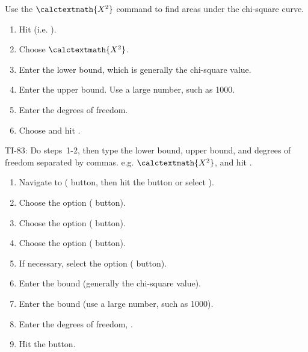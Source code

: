\begin{termBox}{
Use the $\calctextmath{X^2}$ command to find areas under the chi-square curve.
\begin{enumerate}
\setlength{\itemsep}{0mm}
\item Hit   (i.e. ).
\item Choose $\calctextmath{X^2}$.
\item Enter the lower bound, which is generally the chi-square value.
\item Enter the upper bound. Use a large number, such as 1000.
\item Enter the degrees of freedom.
\item Choose  and hit .
\end{enumerate}
TI-83: Do steps~1-2, then type the lower bound, upper bound, and degrees of freedom separated by commas. e.g. $\calctextmath{X^2}$, and hit .}
\end{termBox}

\begin{termBox}{
\begin{enumerate}
\setlength{\itemsep}{0mm}
\item Navigate to  ( button, then hit the  button or select ).
\item Choose the  option ( button).
\item Choose the  option ( button).
\item Choose the  option ( button).
\item If necessary, select the  option ( button).
\item Enter the  bound (generally the chi-square value).
\item Enter the  bound (use a large number, such as 1000).
\item Enter the degrees of freedom, .
\item Hit the  button.
\end{enumerate}
}
\end{termBox}

